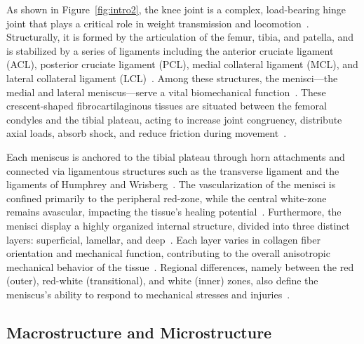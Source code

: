 As shown in Figure~\ref{fig:intro2}, the knee joint is a complex, load-bearing hinge joint that plays a critical role in weight transmission and locomotion~\cite{makris2011kneemeniscus, athanasiou2009engineeringknee, abdelgaied2015comparisonbiomechanical}.
Structurally, it is formed by the articulation of the femur, tibia, and patella, and is stabilized by a series of ligaments including the anterior cruciate ligament (ACL), posterior cruciate ligament (PCL), medial collateral ligament (MCL), and lateral collateral ligament (LCL)~\cite{athanasiou2009engineeringknee, makris2011kneemeniscus}.
Among these structures, the menisci—the medial and lateral meniscus—serve a vital biomechanical function~\cite{makris2011kneemeniscus, baek2015meniscustissue, abdelgaied2015comparisonbiomechanical}.
These crescent-shaped fibrocartilaginous tissues are situated between the femoral condyles and the tibial plateau, acting to increase joint congruency, distribute axial loads, absorb shock, and reduce friction during movement~\cite{makris2011kneemeniscus, athanasiou2009engineeringknee, baek2015meniscustissue, abdelgaied2015comparisonbiomechanical}.

Each meniscus is anchored to the tibial plateau through horn attachments and connected via ligamentous structures such as the transverse ligament and the ligaments of Humphrey and Wrisberg~\cite{athanasiou2009engineeringknee, makris2011kneemeniscus}.
The vascularization of the menisci is confined primarily to the peripheral red-zone, while the central white-zone remains avascular, impacting the tissue's healing potential~\cite{athanasiou2009engineeringknee, makris2011kneemeniscus, tran2020comprehensivereview}.
Furthermore, the menisci display a highly organized internal structure, divided into three distinct layers: superficial, lamellar, and deep~\cite{athanasiou2009engineeringknee, makris2011kneemeniscus, baek2015meniscustissue}.
Each layer varies in collagen fiber orientation and mechanical function, contributing to the overall anisotropic mechanical behavior of the tissue~\cite{makris2011kneemeniscus, baek2015meniscustissue, abdelgaied2015comparisonbiomechanical}.
Regional differences, namely between the red (outer), red-white (transitional), and white (inner) zones, also define the meniscus's ability to respond to mechanical stresses and injuries~\cite{athanasiou2009engineeringknee, makris2011kneemeniscus, baek2015meniscustissue}.

\subsection{Macrostructure and Microstructure}

